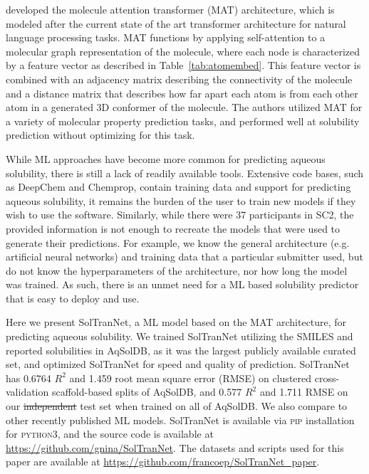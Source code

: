 \documentclass[journal=jcim,manuscript=applicationnotes]{achemso} %
\providecommand{\DIFaddtex}[1]{{\protect\color{blue}\uwave{#1}}} %
\providecommand{\DIFdeltex}[1]{{\protect\color{red}\sout{#1}}}                      %
\providecommand{\DIFaddbegin}{} %
\providecommand{\DIFaddend}{} %
\providecommand{\DIFdelbegin}{} %
\providecommand{\DIFdelend}{} %
\providecommand{\DIFadd}[1]{\texorpdfstring{\DIFaddtex{#1}}{#1}} %
\providecommand{\DIFdel}[1]{\texorpdfstring{\DIFdeltex{#1}}{}} %
\begin{document}
\citet{MAT} developed the molecule attention transformer (MAT) architecture, which is modeled after the current state of the art transformer architecture for natural language processing tasks.
MAT functions by applying self-attention to a molecular graph representation of the molecule, where each node is characterized by a feature vector as described in Table~\ref{tab:atomembed}.
This feature vector is combined with an adjacency matrix describing the connectivity of the molecule and a distance matrix that describes how far apart each atom is from each other atom in a generated 3D conformer of the molecule.
The authors utilized MAT for a variety of molecular property prediction tasks, and performed well at solubility prediction without optimizing for this task.

While ML approaches have become more common for predicting aqueous solubility, there is still a lack of readily available tools.
Extensive code bases, such as DeepChem\cite{deepchem} and Chemprop\cite{chemprop}, contain training data and support for predicting aqueous solubility, \DIFaddbegin \DIFadd{but }\DIFaddend it remains the burden of the user to train new models if they wish to use the software.
Similarly, while there were 37 participants in SC2, the provided information is not enough to recreate the models that were used to generate their predictions.
For example, we know the general architecture (e.g. artificial neural networks) and training data that a particular submitter used, but do not know the hyperparameters of the architecture, nor how long the model was trained.
As such, there is an unmet need for a ML based solubility predictor that is easy to deploy and use.

Here we present SolTranNet, a ML model based on the MAT architecture, for predicting aqueous solubility.
We trained SolTranNet utilizing the SMILES and reported solubilities in AqSolDB\cite{AqSol}, as it was the largest publicly available curated set, and optimized SolTranNet for speed and quality of prediction.
SolTranNet has 0.6764 $R^2$ and 1.459 root mean square error (RMSE) on clustered cross-validation scaffold-based splits of AqSolDB, and 0.577 $R^2$ and 1.711 RMSE on our \DIFdelbegin \DIFdel{independent }\DIFdelend \DIFaddbegin \DIFadd{withheld }\DIFaddend test set when trained on all of AqSolDB.
We also compare to other recently published ML models.\cite{lovric,cui,boobier,llinas}
SolTranNet is available via \textsc{pip} installation for \textsc{python3}, and the source code is available at \url{https://github.com/gnina/SolTranNet}. The datasets and scripts used for this paper are available at \url{https://github.com/francoep/SolTranNet_paper}.
\end{document}
